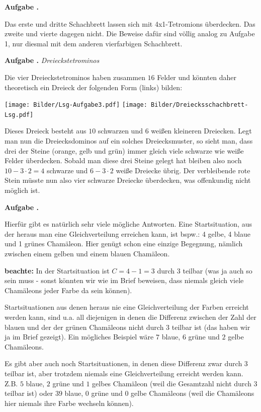\documentclass[a4paper,ngerman,12pt]{scrartcl}
\theoremstyle{definition}
\theoremstyle{plain}
\theoremstyle{remark}
\newlength{\aufgabenskip}
\newcounter{aufgabennummer}
\newenvironment{aufgabe}[1]{
	\addtocounter{aufgabennummer}{1}
	\textbf{Aufgabe \theaufgabennummer.} \emph{#1} \par
}{\vspace{\aufgabenskip}}
\begin{document}
\newpage
\begin{aufgabe}{}
	Das erste und dritte Schachbrett lassen sich mit 4x1-Tetromions überdecken. Das zweite und vierte dagegen nicht. Die Beweise dafür sind völlig analog zu Aufgabe 1, nur diesmal mit dem anderen vierfarbigen Schachbrett.
\end{aufgabe}

\begin{aufgabe}{Dreieckstetrominos}
	Die vier Dreieckstetrominos haben zusammen $16$ Felder und könnten daher theoretisch ein Dreieck der folgenden Form (links) bilden:
	\begin{center}
		\texttt{[image: Bilder/Lsg-Aufgabe3.pdf]} \qquad\qquad
		\texttt{[image: Bilder/Dreiecksschachbrett-Lsg.pdf]}
	\end{center}	 
	Dieses Dreieck besteht aus $10$ schwarzen und $6$ weißen kleineren Dreiecken. Legt man nun die Dreiecksdominos auf ein solches Dreiecksmuster, so sieht man, dass drei der Steine (orange, gelb und grün) immer gleich viele schwarze wie weiße Felder überdecken. Sobald man diese drei Steine gelegt hat bleiben also noch $10-3\cdot2=4$ schwarze und $6-3\cdot2$ weiße Dreiecke übrig. Der verbleibende rote Stein müsste nun also vier schwarze Dreiecke überdecken, was offenkundig nicht möglich ist.
\end{aufgabe}

\begin{aufgabe}{}
	Hierfür gibt es natürlich sehr viele mögliche Antworten. Eine Startsituation, aus der heraus man eine Gleichverteilung erreichen kann, ist bspw.: 4 gelbe, 4 blaue und 1 grünes Chamäleon. Hier genügt schon eine einzige Begegnung, nämlich zwischen einem gelben und einem blauen Chamäleon.
	
	\textbf{beachte:} In der Startsituation ist $C = 4 - 1 = 3$ durch 3 teilbar (was ja auch so sein muss - sonst könnten wir wie im Brief beweisen, dass niemals gleich viele Chamäleons jeder Farbe da sein können).
	
	Startsituationen aus denen heraus nie eine Gleichverteilung der Farben erreicht werden kann, sind u.a. all diejenigen in denen die Differenz zwischen der Zahl der blauen und der der grünen Chamäleons nicht durch $3$ teilbar ist (das haben wir ja im Brief gezeigt). Ein mögliches Beispiel wäre $7$ blaue, $6$ grüne und $2$ gelbe Chamäleons.
	
	Es gibt aber auch noch Startsituationen, in denen diese Differenz zwar durch $3$ teilbar ist, aber trotzdem niemals eine Gleichverteilung erreicht werden kann. Z.B. $5$ blaue, $2$ grüne und $1$ gelbes Chamäleon (weil die Gesamtzahl nicht durch $3$ teilbar ist) oder $39$ blaue, $0$ grüne und $0$ gelbe Chamäleons (weil die Chamäleons hier niemals ihre Farbe wechseln können).
\end{aufgabe}
\end{document}
